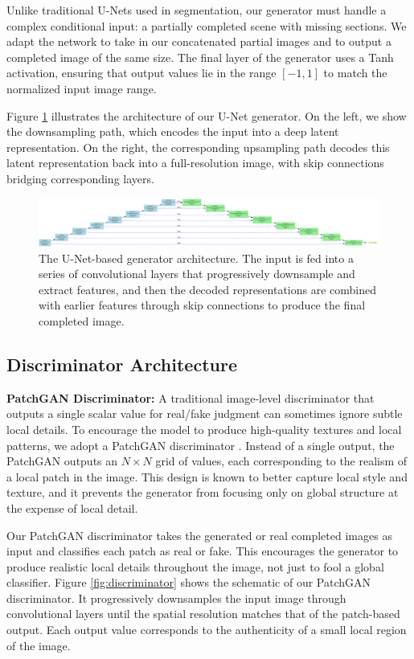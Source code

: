 \documentclass[sigconf]{acmart}
\begin{document}
Unlike traditional U-Nets used in segmentation, our generator must handle a complex conditional input: a partially completed scene with missing sections. We adapt the network to take in our concatenated partial images and to output a completed image of the same size. The final layer of the generator uses a Tanh activation, ensuring that output values lie in the range $[-1, 1]$ to match the normalized input image range.

Figure \ref{fig:generator} illustrates the architecture of our U-Net generator. On the left, we show the downsampling path, which encodes the input into a deep latent representation. On the right, the corresponding upsampling path decodes this latent representation back into a full-resolution image, with skip connections bridging corresponding layers.

\begin{figure}[h!]
    \centering
    \includegraphics[width=\linewidth]{generator.pdf}
    \caption{The U-Net-based generator architecture. The input is fed into a series of convolutional layers that progressively downsample and extract features, and then the decoded representations are combined with earlier features through skip connections to produce the final completed image.}
    \label{fig:generator}
\end{figure}

\subsection*{Discriminator Architecture}

\noindent\textbf{PatchGAN Discriminator:}  
A traditional image-level discriminator that outputs a single scalar value for real/fake judgment can sometimes ignore subtle local details. To encourage the model to produce high-quality textures and local patterns, we adopt a PatchGAN discriminator \cite{Isola2017}. Instead of a single output, the PatchGAN outputs an $N \times N$ grid of values, each corresponding to the realism of a local patch in the image. This design is known to better capture local style and texture, and it prevents the generator from focusing only on global structure at the expense of local detail.

Our PatchGAN discriminator takes the generated or real completed images as input and classifies each patch as real or fake. This encourages the generator to produce realistic local details throughout the image, not just to fool a global classifier. Figure \ref{fig:discriminator} shows the schematic of our PatchGAN discriminator. It progressively downsamples the input image through convolutional layers until the spatial resolution matches that of the patch-based output. Each output value corresponds to the authenticity of a small local region of the image.
\end{document}
